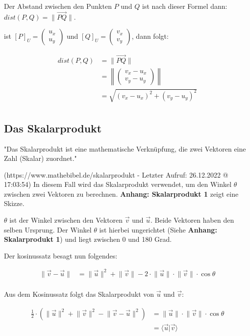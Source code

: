 \documentclass{article}
\newcommand{\m}[1]{\begin{pmatrix}#1\end{pmatrix}}
\begin{document}
    Der Abstand zwischen den Punkten $P$ und $Q$ ist nach dieser Formel dann:
    $dist(P, Q) = \lVert \vec{PQ} \rVert$.
    
    ist ${[P]}_{U} = \m{u_x \\ u_y}$ und ${[Q]}_{U} = \m{v_x \\ v_y}$, dann folgt:

    \[
      \begin{split}
        dist(P, Q) &= \lVert \vec{PQ} \rVert \\
        &= \left \lVert \m{v_x - u_x \\ v_y - u_y} \right \rVert \\
        &= \sqrt{(v_x - u_x)^2 + (v_y - u_y)^2} \\
      \end{split}  
    \] 

    \subsection{Das Skalarprodukt}
    
    "Das Skalarprodukt ist eine mathematische Verknüpfung, die zwei Vektoren eine Zahl (Skalar) zuordnet."

    (https://www.mathebibel.de/skalarprodukt - Letzter Aufruf: 26.12.2022 @ 17:03:54)
    In diesem Fall wird das Skalarprodukt verwendet, um den Winkel $\theta$ zwischen zwei Vektoren zu berechnen.
    \textbf{Anhang: Skalarprodukt 1} zeigt eine Skizze.
    
    $\theta$ ist der Winkel zwischen den Vektoren $\vec{v}$ und $\vec{u}$.
    Beide Vektoren haben den selben Ursprung. Der Winkel $\theta$ ist hierbei ungerichtet
    (Siehe \textbf{Anhang: Skalarprodukt 1}) und liegt zwischen 0 und 180 Grad.
    
    Der kosinussatz besagt nun folgendes:

    \[
        \begin{split}
            \lVert \vec{v} - \vec{u} \rVert &= \lVert \vec{u} \rVert ^2 + \lVert \vec{v} \rVert - 2 \cdot \lVert \vec{u} \rVert \cdot \lVert \vec{v} \rVert \cdot \cos \theta \\
        \end{split}  
    \]

    Aus dem Kosinussatz folgt das Skalarprodukt von $\vec{u}$ und $\vec{v}$:

    \[
        \begin{split}
            \frac{1}{2} \cdot \left ( \lVert \vec{u} \rVert ^2 + \lVert \vec{v} \rVert ^2 - \lVert \vec{v} - \vec{u} \rVert ^2 \right ) &= \lVert \vec{u} \rVert \cdot \lVert \vec{v} \rVert \cdot \cos \theta \\
            &= \langle \vec{u} \vert \vec{v} \rangle \\
        \end{split}  
    \]
\end{document}
